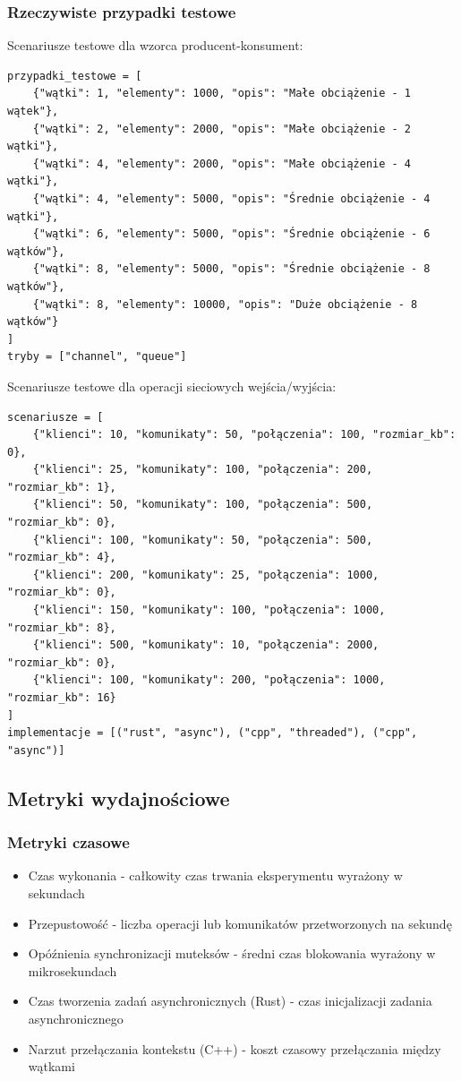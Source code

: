 \subsubsection{Rzeczywiste przypadki testowe}
Scenariusze testowe dla wzorca producent-konsument:
\small
\begin{verbatim}
przypadki_testowe = [
    {"wątki": 1, "elementy": 1000, "opis": "Małe obciążenie - 1 wątek"},
    {"wątki": 2, "elementy": 2000, "opis": "Małe obciążenie - 2 wątki"}, 
    {"wątki": 4, "elementy": 2000, "opis": "Małe obciążenie - 4 wątki"},
    {"wątki": 4, "elementy": 5000, "opis": "Średnie obciążenie - 4 wątki"},
    {"wątki": 6, "elementy": 5000, "opis": "Średnie obciążenie - 6 wątków"},
    {"wątki": 8, "elementy": 5000, "opis": "Średnie obciążenie - 8 wątków"},
    {"wątki": 8, "elementy": 10000, "opis": "Duże obciążenie - 8 wątków"}
]
tryby = ["channel", "queue"]
\end{verbatim}
\normalsize
Scenariusze testowe dla operacji sieciowych wejścia/wyjścia:
\small
\begin{verbatim}
scenariusze = [
    {"klienci": 10, "komunikaty": 50, "połączenia": 100, "rozmiar_kb": 0},
    {"klienci": 25, "komunikaty": 100, "połączenia": 200, "rozmiar_kb": 1},
    {"klienci": 50, "komunikaty": 100, "połączenia": 500, "rozmiar_kb": 0},
    {"klienci": 100, "komunikaty": 50, "połączenia": 500, "rozmiar_kb": 4},
    {"klienci": 200, "komunikaty": 25, "połączenia": 1000, "rozmiar_kb": 0},
    {"klienci": 150, "komunikaty": 100, "połączenia": 1000, "rozmiar_kb": 8},
    {"klienci": 500, "komunikaty": 10, "połączenia": 2000, "rozmiar_kb": 0},
    {"klienci": 100, "komunikaty": 200, "połączenia": 1000, "rozmiar_kb": 16}
]
implementacje = [("rust", "async"), ("cpp", "threaded"), ("cpp", "async")]
\end{verbatim}
\normalsize
\subsection{Metryki wydajnościowe}

\subsubsection{Metryki czasowe}
\begin{itemize}
    \item Czas wykonania - całkowity czas trwania eksperymentu wyrażony w sekundach
    \item Przepustowość - liczba operacji lub komunikatów przetworzonych na sekundę
    \item Opóźnienia synchronizacji muteksów - średni czas blokowania wyrażony w mikrosekundach
    \item Czas tworzenia zadań asynchronicznych (Rust) - czas inicjalizacji zadania asynchronicznego
    \item Narzut przełączania kontekstu (C++) - koszt czasowy przełączania między wątkami
\end{itemize}

